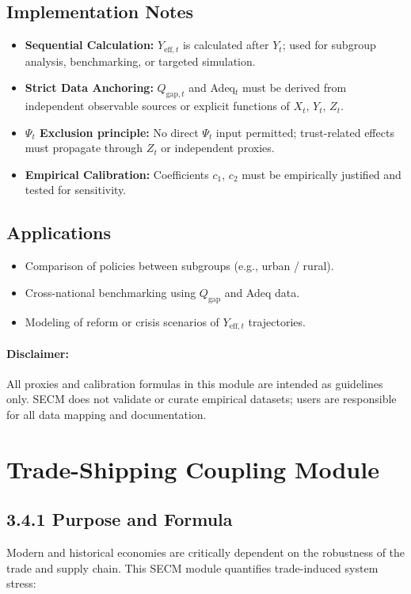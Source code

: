 \documentclass[12pt]{report}
\begin{document}
\subsection*{Implementation Notes}
\begin{itemize}
  \item \textbf{Sequential Calculation:} $Y_{\text{eff},t}$ is calculated after $Y_t$; used for subgroup analysis, benchmarking, or targeted simulation.
  \item \textbf{Strict Data Anchoring:} $Q_{\text{gap},t}$ and Adeq$_t$ must be derived from independent observable sources or explicit functions of $X_t$, $Y_t$, $Z_t$.
  \item \textbf{$\Psi_t$ Exclusion principle:} No direct $\Psi_t$ input permitted; trust-related effects must propagate through $Z_t$ or independent proxies.
  \item \textbf{Empirical Calibration:} Coefficients $c_1$, $c_2$ must be empirically justified and tested for sensitivity.
\end{itemize}

\subsection*{Applications}
\begin{itemize}
  \item Comparison of policies between subgroups (e.g., urban / rural).
  \item Cross-national benchmarking using $Q_{\text{gap}}$ and Adeq data.
  \item Modeling of reform or crisis scenarios of $Y_{\text{eff},t}$ trajectories.
\end{itemize}

\paragraph{Disclaimer:}
All proxies and calibration formulas in this module are intended as guidelines only. SECM does not validate or curate empirical datasets; users are responsible for all data mapping and documentation.

\section{Trade-Shipping Coupling Module}

\subsection*{3.4.1 Purpose and Formula}
Modern and historical economies are critically dependent on the robustness of the trade and supply chain. This SECM module quantifies trade-induced system stress:
\end{document}

